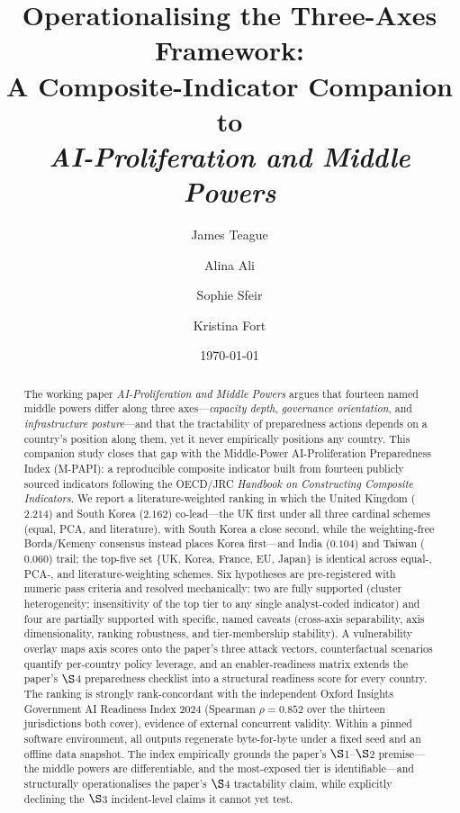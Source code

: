 \documentclass[11pt]{article}
\title{\textbf{Operationalising the Three-Axes Framework:\\ A Composite-Indicator Companion to\\ \emph{AI-Proliferation and Middle Powers}}}
\author[]{James Teague \and Alina Ali \and Sophie Sfeir \and Kristina Fort}
\affil[]{\small Companion to the working paper \emph{AI-Proliferation and Middle Powers: Preparation and Response Mechanisms} (2026)}
\date{\today}
\begin{document}
\maketitle
\thispagestyle{fancy}

\begin{abstract}
\noindent The working paper \emph{AI-Proliferation and Middle Powers} argues that fourteen named middle powers differ along three axes---\emph{capacity depth}, \emph{governance orientation}, and \emph{infrastructure posture}---and that the tractability of preparedness actions depends on a country's position along them, yet it never empirically positions any country. This companion study closes that gap with the Middle-Power AI-Proliferation Preparedness Index (M-PAPI): a reproducible composite indicator built from fourteen publicly sourced indicators following the OECD/JRC \emph{Handbook on Constructing Composite Indicators}. We report a literature-weighted ranking in which the United Kingdom ($2.214$) and South Korea ($2.162$) co-lead---the UK first under all three cardinal schemes (equal, PCA, and literature), with South Korea a close second, while the weighting-free Borda/Kemeny consensus instead places Korea first---and India ($0.104$) and Taiwan ($0.060$) trail; the top-five set $\{$UK, Korea, France, EU, Japan$\}$ is identical across equal-, PCA-, and literature-weighting schemes. Six hypotheses are pre-registered with numeric pass criteria and resolved mechanically: two are fully supported (cluster heterogeneity; insensitivity of the top tier to any single analyst-coded indicator) and four are partially supported with specific, named caveats (cross-axis separability, axis dimensionality, ranking robustness, and tier-membership stability). A vulnerability overlay maps axis scores onto the paper's three attack vectors, counterfactual scenarios quantify per-country policy leverage, and an enabler-readiness matrix extends the paper's $\S$4 preparedness checklist into a structural readiness score for every country. The ranking is strongly rank-concordant with the independent Oxford Insights Government AI Readiness Index 2024 (Spearman $\rho=0.852$ over the thirteen jurisdictions both cover), evidence of external concurrent validity. Within a pinned software environment, all outputs regenerate byte-for-byte under a fixed seed and an offline data snapshot. The index empirically grounds the paper's $\S$1--$\S$2 premise---the middle powers are differentiable, and the most-exposed tier is identifiable---and structurally operationalises the paper's $\S$4 tractability claim, while explicitly declining the $\S$3 incident-level claims it cannot yet test.
\end{abstract}
\end{document}
